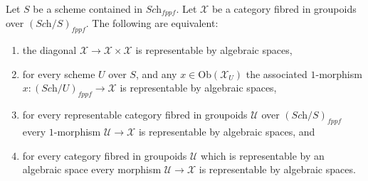 \begin{lemma}
\label{lemma-representable-diagonal}
Let $S$ be a scheme contained in $\textit{Sch}_{fppf}$.
Let $\mathcal{X}$ be a category fibred in groupoids over
$(\textit{Sch}/S)_{fppf}$. The following are equivalent:
\begin{enumerate}
\item the diagonal $\mathcal{X} \to \mathcal{X} \times \mathcal{X}$
is representable by algebraic spaces,
\item for every scheme $U$ over $S$, and any $x \in \text{Ob}(\mathcal{X}_U)$
the associated $1$-morphism $x : (\textit{Sch}/U)_{fppf} \to \mathcal{X}$
is representable by algebraic spaces,
\item for every representable category fibred in groupoids $\mathcal{U}$
over $(\textit{Sch}/S)_{fppf}$ every $1$-morphism $\mathcal{U} \to \mathcal{X}$
is representable by algebraic spaces, and
\item for every category fibred in groupoids $\mathcal{U}$ which is
representable by an algebraic space every morphism
$\mathcal{U} \to \mathcal{X}$ is representable by algebraic spaces.
\end{enumerate}
\end{lemma}

